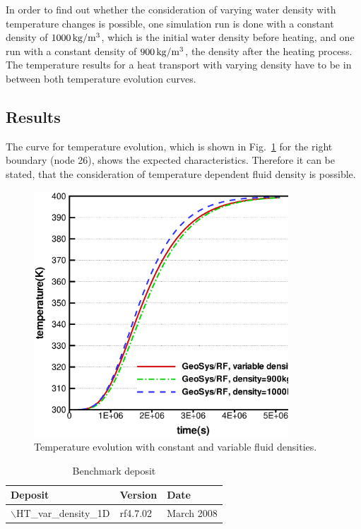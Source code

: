 In order to find out whether the consideration of varying water density with temperature changes is possible, one simulation run is done with a constant density of $\unit[1000]{kg/m^{3}}$, which is the initial water density before heating, and one run with a constant density of $\unit[900]{kg/m^{3}}$, the density after the heating process. The temperature results for a heat transport with varying density have to be in between both temperature evolution curves.

\subsection{Results}

The curve for temperature evolution, which is shown in Fig.~\ref{figHT1} for the right boundary (node 26), shows the expected characteristics. Therefore it can be stated, that the consideration of temperature dependent fluid density is possible.
\begin{figure}[htbp]
\centering
\includegraphics[width=0.85\textwidth]{T/figures/figHT1.eps}
\caption{\label{figHT1}Temperature evolution with constant and variable fluid densities.}
\end{figure}

\begin{table}[H]
\caption{Benchmark deposit}
\begin{center}
\begin{tabular}{lll}
\toprule
Deposit & Version & Date \\
\midrule
$\backslash$HT\_var\_density\_1D & rf4.7.02 & March 2008\\
\bottomrule
\end{tabular}
\end{center}
\end{table}


